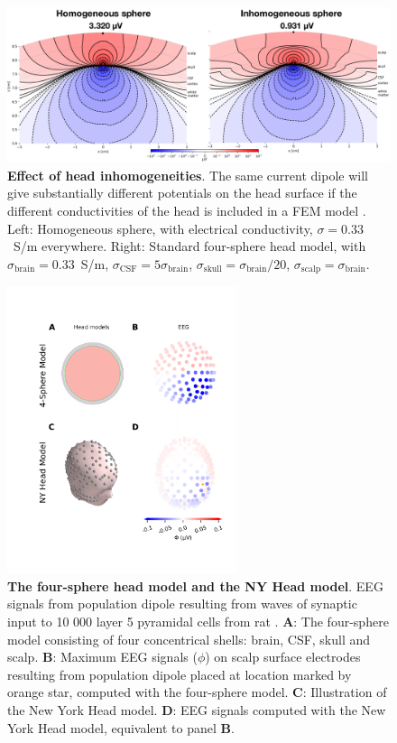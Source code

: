 \documentclass[preprint,11pt,authoryear]{elsarticle}
\begin{document}
\begin{figure}[!ht]
\begin{center}
\includegraphics[width=1.0\textwidth]{4o_contour}
\end{center}
\caption{\textbf{Effect of head inhomogeneities}.
The same current dipole will give substantially different potentials on the head surface if the different conductivities of the head is included in a FEM model  \citep{Naess2017}. Left: Homogeneous sphere, with electrical conductivity, $\sigma=0.33$~S/m everywhere. Right: Standard four-sphere head model, with $\sigma_{\text{brain}}=0.33$~S/m, $\sigma_{\text{CSF}}=5\sigma_{\text{brain}}$, 
$\sigma_{\text{skull}}=\sigma_{\text{brain}} / 20$, $\sigma_{\text{scalp}}=\sigma_{\text{brain}}$.
}
\label{fig:foursphere_contour}
\end{figure}

\begin{figure}[!ht]
\begin{center}
\includegraphics[width=0.6\textwidth]{head_models.pdf}
\end{center}
\caption{\textbf{The four-sphere head model and the NY Head model}. EEG signals from population dipole resulting from waves of synaptic input to 10 000 layer 5 pyramidal cells from rat \citep{Hay2011}.
	{\bf A}: The four-sphere model consisting of four concentrical shells: brain, CSF, skull and scalp. 
	{\bf B}: Maximum EEG signals ($\phi$) on scalp surface electrodes resulting from population dipole placed at location marked by orange star, computed with the four-sphere model.
	{\bf C}: Illustration of the New York Head model.
	{\bf D}: EEG signals computed with the New York Head model, equivalent to panel {\bf B}.
}
\label{fig:head_models}
\end{figure}
\end{document}
